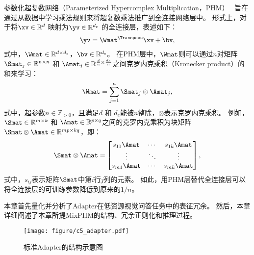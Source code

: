 参数化超复数网络（Parameterized Hypercomplex Multiplication，PHM）~\cite{zhang2021beyond} 旨在通过从数据中学习乘法规则来将超复数乘法推广到全连接网络层中。
形式上，对于将$\xv \in \mathbb{R}^{d}$ 映射为$\yv \in \mathbb{R}^{d_e}$ 的全连接层，表述如下：
\begin{equation} 
\begin{aligned} 
\yv = \Wmat^{\Transpose}\xv + \bv, 
\end{aligned}
\label{eq:fc} 
\end{equation}
式中，$\Wmat \in \mathbb{R}^{d \times d_e}$，$\bv \in \mathbb{R}^{d_e}$。
在PHM层中，$\Wmat$则可以通过$n$对矩阵$\Smat_j \in \mathbb{R}^{n \times n}$ 和 $\Amat_j \in \mathbb{R}^{\frac{d}{n} \times \frac{d_e}{n}}$之间克罗内克乘积（Kronecker product）的和来学习：
\begin{equation} 
\begin{aligned} 
\Wmat = \sum_{j=1}^{n} \Smat_j \otimes \Amat_j, 
\end{aligned}
\label{eq:phm} 
\end{equation}
式中，超参数$n \in \mathbb{Z}_{> 0}$，且满足$d$ 和 $d_e$能被$n$整除，$\otimes$表示克罗内克乘积。
例如，$\Smat \in \mathbb{R}^{m \times k}$ 和 $\Amat \in \mathbb{R}^{p \times q}$之间的克罗内克乘积为块矩阵$\Smat \otimes \Amat \in \mathbb{R}^{mp \times kq}$，即：
\begin{equation} 
\begin{aligned} 
\Smat \otimes \Amat = 
\begin{bmatrix}
s_{11}\Amat &\cdots &s_{1k}\Amat \\
\vdots &\ddots &\vdots \\
s_{m1}\Amat &\cdots &s_{mk}\Amat 
\end{bmatrix}, 
\end{aligned}
\label{eq:kp} 
\end{equation}
式中，$s_{ij}$表示矩阵$\Smat$中第$i$行$j$列的元素。
如此，用PHM层替代全连接层可以将全连接层的可训练参数降低到原来的$1/{n}$。




本章首先量化并分析了Adapter在低资源视觉问答任务中的表征冗余。
然后，本章详细阐述了本章所提MixPHM的结构、冗余正则化和推理过程。



\begin{figure}[!t]
\centering
\texttt{[image: figure/c5\_adapter.pdf]}
\caption{标准Adapter的结构示意图 }
\label{fig:c5_adapter}
\end{figure}


